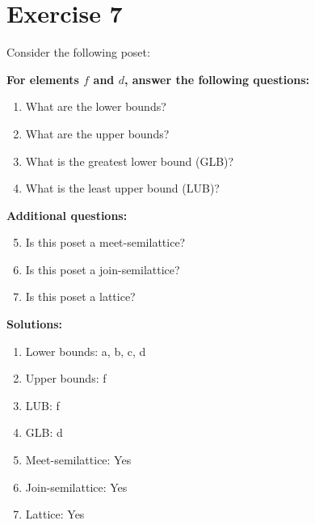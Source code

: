 \documentclass{article}
\begin{document}
\section*{Exercise 7}
Consider the following poset:
\begin{center}
\end{center}

    \textbf{For elements $f$ and $d$, answer the following questions:}
\begin{enumerate}
    \item What are the lower bounds?
    \item What are the upper bounds?
    \item What is the greatest lower bound (GLB)?
    \item What is the least upper bound (LUB)?
\end{enumerate}
    \hspace*{3ex} \textbf{Additional questions:}
\begin{enumerate}
    \setcounter{enumi}{4}
    \item Is this poset a meet-semilattice?
    \item Is this poset a join-semilattice?
    \item Is this poset a lattice?
\end{enumerate}

\textbf{Solutions:}
\begin{enumerate}
    \item Lower bounds: {a, b, c, d}
    \item Upper bounds: {f}
    \item LUB: f
    \item GLB: d
    \item Meet-semilattice: Yes
    \item Join-semilattice: Yes
    \item Lattice: Yes
\end{enumerate}
\newpage
\end{document}
